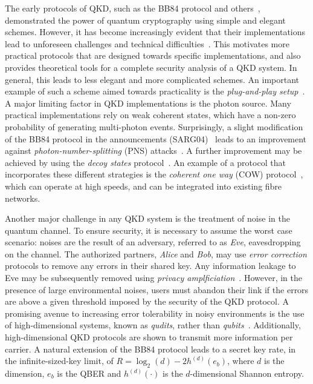 \documentclass[twocolumn,aps,prl,floatfix,superscriptaddress]{revtex4-1}
\begin{document}
\maketitle

The early protocols of QKD, such as the BB84 protocol and others~\cite{bennett:84,ekert:91,bennett:92,gisin:02}, demonstrated the power of quantum cryptography using simple and elegant schemes. However, it has become increasingly evident that their implementations lead to unforeseen challenges and technical difficulties~\cite{scarani:09}. This motivates more practical protocols that are designed towards specific implementations, and also provides theoretical tools for a complete security analysis of a QKD system. In general, this leads to less elegant and more complicated schemes. An important example of such a scheme aimed towards practicality is the \emph{plug-and-play setup}~\cite{muller:97}. A major limiting factor in QKD implementations is the photon source. Many practical implementations rely on weak coherent states, which have a non-zero probability of generating multi-photon events. Surprisingly, a slight modification of the BB84 protocol in the announcements (SARG04)~\cite{scarani:04} leads to an improvement against \emph{photon-number-splitting} (PNS) attacks~\cite{brassard:00}. A further improvement may be achieved by using the \emph{decoy states} protocol~\cite{hwang:03}. An example of a protocol that incorporates these different strategies is the \emph{coherent one way} (COW) protocol~\cite{stucki:05}, which can operate at high speeds, and can be integrated into existing fibre networks.

Another major challenge in any QKD system is the treatment of noise in the quantum channel. To ensure security, it is necessary to assume the worst case scenario: noises are the result of an adversary, referred to as \emph{Eve}, eavesdropping on the channel. The authorized partners, \emph{Alice} and \emph{Bob}, may use \emph{error correction} protocols to remove any errors in their shared key. Any information leakage to Eve may be subsequently removed using \emph{privacy amplficiation}~\cite{bennett:95}. However, in the presence of large environmental noises, users must abandon their link if the errors are above a given threshold imposed by the security of the QKD protocol. A promising avenue to increasing error tolerability in noisy environments is the use of high-dimensional systems, known as \emph{qudits}, rather than \emph{qubits}~\cite{bechmann:00a,bechmann:00b,cerf:02}. Additionally, high-dimensional QKD protocols are shown to transmit more information per carrier. A natural extension of the BB84 protocol leads to a secret key rate, in the infinite-sized-key limit, of $R=\log_2(d)-2 h^{(d)}(e_b)$, where $d$ is the dimension, $e_b$ is the QBER and $h^{(d)}(\cdot)$ is the $d$-dimensional Shannon entropy.%
\end{document}
